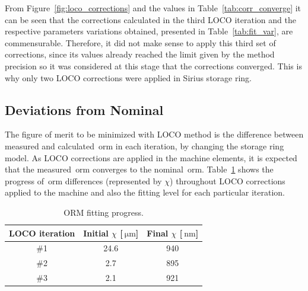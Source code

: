 From Figure~\ref{fig:loco_corrections} and the values in Table~\ref{tab:corr_converge} it can be seen that the corrections calculated in the third LOCO iteration and the respective parameters variations obtained, presented in Table~\ref{tab:fit_var}, are commensurable. Therefore, it did not make sense to apply this third set of corrections, since its values already reached the limit given by the method precision so it was considered at this stage that the corrections converged. This is why only two LOCO corrections were applied in Sirius storage ring.

\subsection{Deviations from Nominal}
The figure of merit to be minimized with LOCO method is the difference between measured and calculated~\gls{orm} in each iteration, by changing the storage ring model. As LOCO corrections are applied in the machine elements, it is expected that the measured~\gls{orm} converges to the nominal~\gls{orm}. Table~\ref{tab:orm_progress} shows the progress of~\gls{orm} differences (represented by $\chi$) throughout LOCO corrections applied to the machine and also the fitting level for each particular iteration.
\begin{table}[h!]
    \centering
    \caption{ORM fitting progress.}
    \label{tab:orm_progress}
    \begin{tabular}{ccc}
        \toprule\toprule
        LOCO iteration & Initial $\chi$ [$\SI{}{\micro\meter}$] & Final $\chi$ [$\SI{}{\nano\meter}$] \\
        \hline
        \#1 & 24.6 & 940 \\
        \#2 & 2.7 & 895 \\
        \#3 & 2.1 & 921 \\
        \bottomrule\bottomrule
    \end{tabular}
\end{table}

